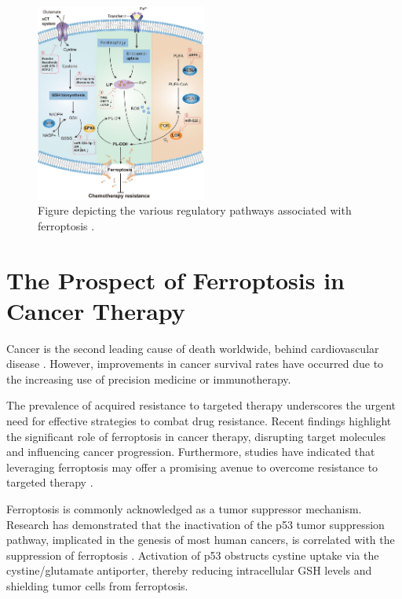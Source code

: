 \begin{figure}[ht]
	\begin{center}
		\includegraphics[width = 0.5\textwidth]{Fig/ferroptosis.png}
		\end{center}
		\caption{Figure depicting the various regulatory pathways associated with ferroptosis \citep{ferro_cancer}.}\label{fig:ferro_mech}
\end{figure}

\section{The Prospect of Ferroptosis in Cancer Therapy}

Cancer is the second leading cause of death worldwide, behind cardiovascular disease \citep{cancer}. However, improvements in cancer survival rates have occurred due to the increasing use of precision medicine or immunotherapy.

The prevalence of acquired resistance to targeted therapy underscores the urgent need for effective strategies to combat drug resistance. Recent findings highlight the significant role of ferroptosis in cancer therapy, disrupting target molecules and influencing cancer progression. Furthermore, studies have indicated that leveraging ferroptosis may offer a promising avenue to overcome resistance to targeted therapy \citep{ferro_drugs}.

Ferroptosis is commonly acknowledged as a tumor suppressor mechanism. Research has demonstrated that the inactivation of the p53 tumor suppression pathway, implicated in the genesis of most human cancers, is correlated with the suppression of ferroptosis \citep{p53}. Activation of p53 obstructs cystine uptake via the cystine/glutamate antiporter, thereby reducing intracellular \acs{GSH} levels and shielding tumor cells from ferroptosis. 

